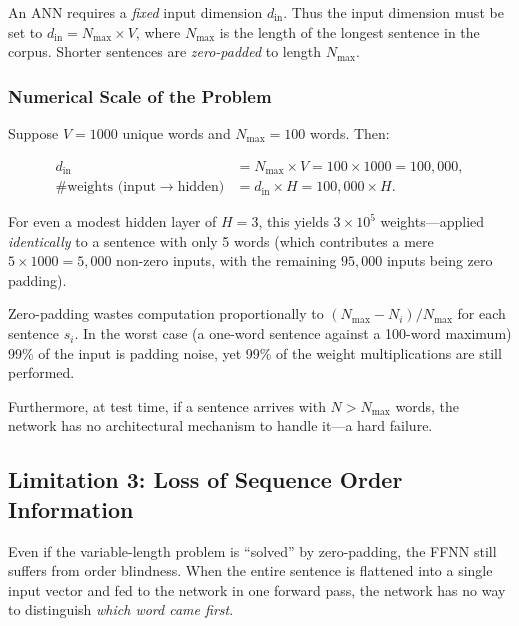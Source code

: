 \documentclass[12pt,a4paper]{article}
\begin{document}
An ANN requires a \emph{fixed} input dimension $d_{\text{in}}$.  Thus the
input dimension must be set to $d_{\text{in}} = N_{\max} \times V$, where
$N_{\max}$ is the length of the longest sentence in the corpus.  Shorter
sentences are \emph{zero-padded} to length $N_{\max}$.

\subsubsection*{Numerical Scale of the Problem}

Suppose $V = 1000$ unique words and $N_{\max} = 100$ words.  Then:

\begin{align}
  d_{\text{in}} &= N_{\max} \times V = 100 \times 1000 = 100{,}000, \\
  \#\text{weights (input}\to\text{hidden)} &= d_{\text{in}} \times H
    = 100{,}000 \times H.
\end{align}

For even a modest hidden layer of $H = 3$, this yields $3 \times 10^5$
weights---applied \emph{identically} to a sentence with only 5 words (which
contributes a mere $5 \times 1000 = 5{,}000$ non-zero inputs, with the
remaining $95{,}000$ inputs being zero padding).

\begin{keyinsight}
Zero-padding wastes computation proportionally to $(N_{\max} - N_i)/N_{\max}$
for each sentence $s_i$.  In the worst case (a one-word sentence against a
100-word maximum) 99\% of the input is padding noise, yet 99\% of the
weight multiplications are still performed.
\end{keyinsight}

Furthermore, at test time, if a sentence arrives with $N > N_{\max}$ words,
the network has no architectural mechanism to handle it---a hard failure.

\subsection{Limitation 3: Loss of Sequence Order Information}
\label{subsec:order_loss}

Even if the variable-length problem is ``solved'' by zero-padding, the FFNN
still suffers from order blindness.  When the entire sentence is flattened
into a single input vector and fed to the network in one forward pass, the
network has no way to distinguish \emph{which word came first}.
\end{document}

